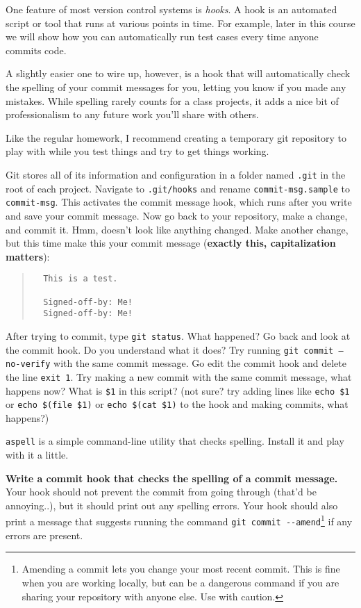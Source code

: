 \documentclass{article}
\begin{document}
One feature of most version control systems is \emph{hooks}. A hook is an
automated script or tool that runs at various points in time. For example,
later in this course we will show how you can automatically run test cases
every time anyone commits code.

\medskip
\noindent
A slightly easier one to wire up, however, is a hook that will automatically
check the spelling of your commit messages for you, letting you know if you
made any mistakes. While spelling rarely counts for a class projects, it
adds a nice bit of professionalism to any future work you'll share with
others.

\medskip
\noindent
Like the regular homework, I recommend creating a temporary git repository to
play with while you test things and try to get things working.

\medskip
\noindent
Git stores all of its information and configuration in a folder named
\texttt{.git} in the root of each project. Navigate to \texttt{.git/hooks} and
rename \texttt{commit-msg.sample} to \texttt{commit-msg}. This activates the
commit message hook, which runs after you write and save your commit message.
Now go back to your repository, make a change, and commit it. Hmm, doesn't
look like anything changed. Make another change, but this time make this your
commit message (\textbf{exactly this, capitalization matters}):
\begin{quote}
  \begin{verbatim}
  This is a test.

  Signed-off-by: Me!
  Signed-off-by: Me!\end{verbatim}
\end{quote}
After trying to commit, type \texttt{git status}. What happened? Go back and
look at the commit hook. Do you understand what it does? Try running
\texttt{git commit --no-verify} with the same commit message. Go edit the
commit hook and delete the line \texttt{exit 1}. Try making a new commit with
the same commit message, what happens now? What is \texttt{\$1} in this
script?  (not sure? try adding lines like \texttt{echo~\$1} or
\texttt{echo~\$(file~\$1)} or \texttt{echo~\$(cat~\$1)} to the hook and making
commits, what happens?)

\medskip
\noindent
\texttt{aspell} is a simple command-line utility that checks spelling. Install
it and play with it a little.

\medskip
\noindent
\textbf{Write a commit hook that checks the spelling of a commit message.}
Your hook should not prevent the commit from going through (that'd be
annoying..), but it should print out any spelling errors. Your hook should
also print a message that suggests running the command
\texttt{git~commit~-{}-amend}\footnote{%
  Amending a commit lets you change your most recent commit. This is fine when
  you are working locally, but can be a dangerous command if you are sharing
  your repository with anyone else. Use with caution.
} if any errors are present.
\end{document}
